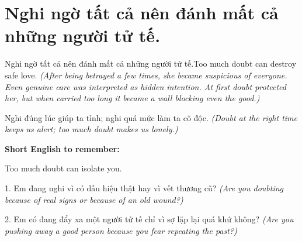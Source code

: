 \section{Nghi ngờ tất cả nên đánh mất cả những người tử tế.}
\begin{truyen}{Nghi ngờ tất cả nên đánh mất cả những người tử tế.}{Too much doubt can destroy safe love.}
\textit{(After being betrayed a few times, she became suspicious of everyone. Even genuine care was interpreted as hidden intention. At first doubt protected her, but when carried too long it became a wall blocking even the good.)}
\end{truyen}
\begin{baihoc}
Nghi đúng lúc giúp ta tỉnh; nghi quá mức làm ta cô độc.
\textit{(Doubt at the right time keeps us alert; too much doubt makes us lonely.)}
\end{baihoc}
\begin{ghinhoanh}
\textbf{Short English to remember:}

Too much doubt can isolate you.
\end{ghinhoanh}
\begin{tuhocnhanh}
1. Em đang nghi vì có dấu hiệu thật hay vì vết thương cũ? \textit{(Are you doubting because of real signs or because of an old wound?)}

2. Em có đang đẩy xa một người tử tế chỉ vì sợ lặp lại quá khứ không? \textit{(Are you pushing away a good person because you fear repeating the past?)}
\end{tuhocnhanh}
\ngancach

